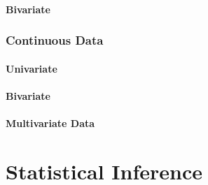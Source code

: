 \documentclass[12pt,a4paper]{report}
\begin{document}
\subsubsection{Bivariate}


\subsection{Continuous Data}

\subsubsection{Univariate}


\subsubsection{Bivariate}

\subsubsection{Multivariate Data}





\chapter{Statistical Inference} 




\newpage

\appendix





\newpage
{}

%

\label{sec:bibliography}
\end{document}
